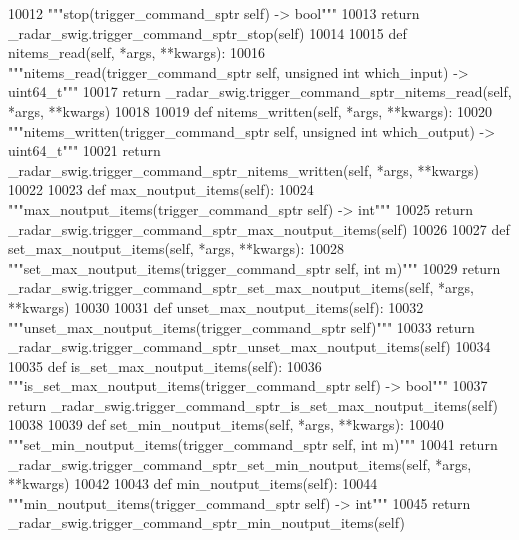 \begin{DoxyCode}
{{{{{{{{{{{{{{{{{{{{{{{{{{{{{{{{10012         \textcolor{stringliteral}{"""stop(trigger\_command\_sptr self) -> bool"""}
10013         \textcolor{keywordflow}{return} \_radar\_swig.trigger\_command\_sptr\_stop(self)
10014 
10015     \textcolor{keyword}{def }nitems_read(self, *args, **kwargs):
10016         \textcolor{stringliteral}{"""nitems\_read(trigger\_command\_sptr self, unsigned int which\_input) -> uint64\_t"""}
10017         \textcolor{keywordflow}{return} \_radar\_swig.trigger\_command\_sptr\_nitems\_read(self, *args, **kwargs)
10018 
10019     \textcolor{keyword}{def }nitems_written(self, *args, **kwargs):
10020         \textcolor{stringliteral}{"""nitems\_written(trigger\_command\_sptr self, unsigned int which\_output) -> uint64\_t"""}
10021         \textcolor{keywordflow}{return} \_radar\_swig.trigger\_command\_sptr\_nitems\_written(self, *args, **kwargs)
10022 
10023     \textcolor{keyword}{def }max_noutput_items(self):
10024         \textcolor{stringliteral}{"""max\_noutput\_items(trigger\_command\_sptr self) -> int"""}
10025         \textcolor{keywordflow}{return} \_radar\_swig.trigger\_command\_sptr\_max\_noutput\_items(self)
10026 
10027     \textcolor{keyword}{def }set_max_noutput_items(self, *args, **kwargs):
10028         \textcolor{stringliteral}{"""set\_max\_noutput\_items(trigger\_command\_sptr self, int m)"""}
10029         \textcolor{keywordflow}{return} \_radar\_swig.trigger\_command\_sptr\_set\_max\_noutput\_items(self, *args, **kwargs)
10030 
10031     \textcolor{keyword}{def }unset_max_noutput_items(self):
10032         \textcolor{stringliteral}{"""unset\_max\_noutput\_items(trigger\_command\_sptr self)"""}
10033         \textcolor{keywordflow}{return} \_radar\_swig.trigger\_command\_sptr\_unset\_max\_noutput\_items(self)
10034 
10035     \textcolor{keyword}{def }is_set_max_noutput_items(self):
10036         \textcolor{stringliteral}{"""is\_set\_max\_noutput\_items(trigger\_command\_sptr self) -> bool"""}
10037         \textcolor{keywordflow}{return} \_radar\_swig.trigger\_command\_sptr\_is\_set\_max\_noutput\_items(self)
10038 
10039     \textcolor{keyword}{def }set_min_noutput_items(self, *args, **kwargs):
10040         \textcolor{stringliteral}{"""set\_min\_noutput\_items(trigger\_command\_sptr self, int m)"""}
10041         \textcolor{keywordflow}{return} \_radar\_swig.trigger\_command\_sptr\_set\_min\_noutput\_items(self, *args, **kwargs)
10042 
10043     \textcolor{keyword}{def }min_noutput_items(self):
10044         \textcolor{stringliteral}{"""min\_noutput\_items(trigger\_command\_sptr self) -> int"""}
10045         \textcolor{keywordflow}{return} \_radar\_swig.trigger\_command\_sptr\_min\_noutput\_items(self)
}}}}}}}}}}}}}}}}}}}}}}}}}}}}}}}}
\end{DoxyCode}

